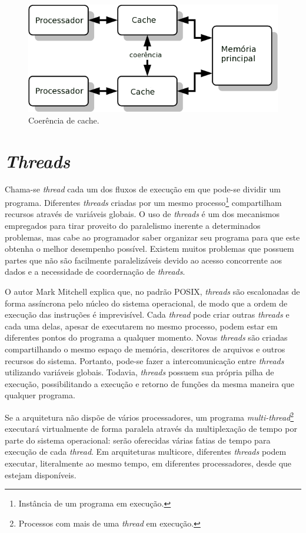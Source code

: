 \documentclass[ccc, pg2]{esinucpel}
\begin{document}
\begin{figure}[h]
\centering
\includegraphics[scale=.86]{images/Cache_Coherency.png}
\caption{Coerência de cache.}
\label{fig:cache}
\end{figure}


\section{\textit{Threads}} \label{sec:threads}
Chama-se \textit{thread} cada um dos fluxos de execução em que pode-se dividir um programa. Diferentes \textit{threads} criadas por um mesmo processo\footnote{Instância de um programa em execução.} compartilham recursos através de variáveis globais. O uso de \textit{threads} é um dos mecanismos empregados para tirar proveito do paralelismo inerente a determinados problemas, mas cabe ao programador saber organizar seu programa para que este obtenha o melhor desempenho possível. Existem muitos problemas que possuem partes que não são facilmente paralelizáveis devido ao acesso concorrente aos dados e a necessidade de coordernação de \textit{threads}.

O autor Mark Mitchell \cite{bib:advlinprog} explica que, no padrão POSIX, {\it threads} são escalonadas de forma assíncrona pelo núcleo do sistema operacional, de modo que a ordem de execução das instruções é imprevisível. Cada {\it thread} pode criar outras {\it threads} e cada uma delas, apesar de executarem no mesmo processo, podem estar em diferentes pontos do programa a qualquer momento. Novas {\it threads} são criadas compartilhando o mesmo espaço de memória, descritores de arquivos e outros recursos do sistema. Portanto, pode-se fazer a intercomunicação entre {\it threads} utilizando variáveis globais. Todavia, {\it threads} possuem sua própria pilha de execução, possibilitando a execução e retorno de funções da mesma maneira que qualquer programa.

Se a arquitetura não dispõe de vários processadores, um programa {\it multi-thread}\footnote{Processos com mais de uma \textit{thread} em execução.} executará virtualmente de forma paralela através da multiplexação de tempo por parte do sistema operacional: serão oferecidas várias fatias de tempo para execução de cada \textit{thread}. Em arquiteturas multicore, diferentes \textit{threads} podem executar, literalmente ao mesmo tempo, em diferentes processadores, desde que estejam disponíveis.
\end{document}

